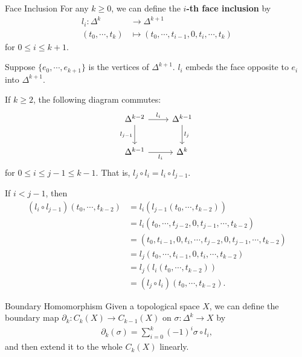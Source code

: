 \documentclass{report}
\begin{document}
\begin{definition}{Face Inclusion}{}
	For any $k\ge 0$, we can define the \textbf{$i$-th face inclusion} by
	\begin{align*}
		l_i: \Delta^{k} &\longrightarrow  \Delta^{k+1}\\
		(t_0, \cdots, t_k) &\longmapsto (t_0, \cdots, t_{i-1}, 0, t_{i}, \cdots, t_{k})
	\end{align*}
	for $0\leq i\leq k+1$. 
\end{definition}

Suppose $\{e_0,\cdots,e_{k+1}\}$ is the vertices of $\Delta^{k+1}$. $l_i$ embeds the face opposite to $e_i$ into $\Delta^{k+1}$.

\begin{proposition}{}{}
	If $k\ge 2$, the following diagram commutes:
	\begin{equation*}
		\begin{tikzcd}[ampersand replacement=\&]
			\Delta^{k-2} \arrow[r, "l_i"] \arrow[d, "l_{j-1}"']
			\& \Delta^{k-1}  \arrow[d, "l_{j}"] \\ [5pt]
			\Delta^{k-1}  \arrow[r, "l_i"']
			\&  \Delta^{k} 
		\end{tikzcd}			
	\end{equation*}
	for $0\le i\le j-1\le k-1$. That is, $l_j\circ l_i=l_i\circ l_{j-1}$.
\end{proposition}

\begin{prf}
	If $i<j-1$, then
	\[
	\begin{aligned}
		\left(l_i\circ l_{j-1}\right)(t_0, \cdots, t_{k-2})&=l_i\left(l_{j-1}(t_0, \cdots, t_{k-2})\right)\\
		&=l_i\left(t_0, \cdots, t_{j-2}, 0, t_{j-1}, \cdots, t_{k-2}\right)\\
		&=\left(t_0, t_{i-1},0,t_{i},\cdots, t_{j-2}, 0, t_{j-1}, \cdots, t_{k-2}\right)\\
		&=l_j\left(t_0, \cdots, t_{i-1}, 0, t_{i}, \cdots, t_{k-2}\right)\\
		&=l_j\left(l_i(t_0, \cdots, t_{k-2})\right)\\
		&=(l_j \circ l_i)(t_0, \cdots, t_{k-2}).
	\end{aligned}
	\]
\end{prf}


\begin{definition}{Boundary Homomorphism}{}
	Given a topological space $X$, we can define the boundary map $\partial_k:C_k(X)\rightarrow C_{k-1}(X)$ on $\sigma:\Delta^k\to X$ by
	\begin{align*}
		\partial_k\left(\sigma\right)=\sum_{i=0}^k(-1)^{i}\sigma\circ l_i,
	\end{align*}
	and then extend it to the whole $C_k(X)$ linearly.
\end{definition}
\end{document}
